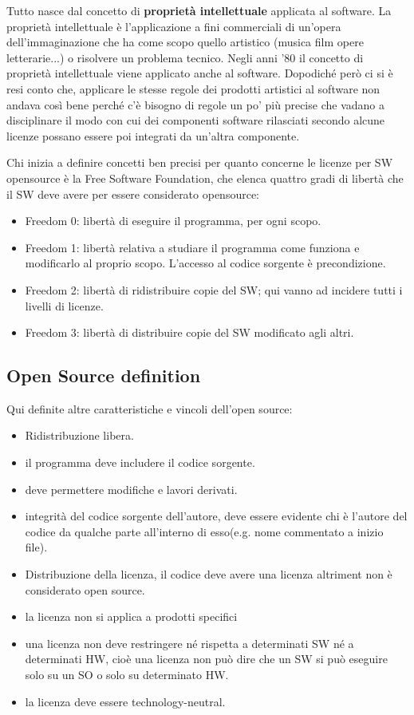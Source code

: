 \documentclass[10pt,a4paper]{book}
\begin{document}
Tutto nasce dal concetto di \textbf{proprietà intellettuale} applicata al software. La proprietà intellettuale è l'applicazione a fini commerciali di un'opera dell'immaginazione che ha come scopo quello artistico (musica film opere letterarie...) o risolvere un problema tecnico.
Negli anni '80 il concetto di proprietà intellettuale viene applicato anche al software.
Dopodiché però ci si è resi conto che, applicare le stesse regole dei prodotti artistici al software non andava così bene perché c'è bisogno di regole un po' più precise che vadano a disciplinare il modo con cui dei componenti software rilasciati secondo alcune licenze possano essere poi integrati da un'altra componente.

Chi inizia a definire concetti ben precisi per quanto concerne le licenze per SW opensource è la Free Software Foundation, che elenca quattro gradi di libertà che il SW deve avere per essere considerato opensource:
\begin{itemize}
\item Freedom 0: libertà di eseguire il programma, per ogni scopo.
\item Freedom 1: libertà relativa a studiare il programma come funziona e modificarlo al proprio scopo. L'accesso al codice sorgente è precondizione.
\item Freedom 2: libertà di ridistribuire copie del SW; qui vanno ad incidere tutti i livelli di licenze.
\item Freedom 3: libertà di distribuire copie del SW modificato agli altri.
\end{itemize}

\subsection{Open Source definition}
Qui definite altre caratteristiche e vincoli dell'open source:
\begin{itemize}
\item Ridistribuzione libera.
\item il programma deve includere il codice sorgente.
\item deve permettere modifiche e lavori derivati.
\item integrità del codice sorgente dell'autore, deve essere evidente chi è l'autore del codice da qualche parte all'interno di esso(e.g. nome commentato a inizio file).
\item Distribuzione della licenza, il codice deve avere una licenza altriment non è considerato open source.
\item la licenza non si applica a prodotti specifici
\item una licenza non deve restringere né rispetta a determinati SW né a determinati HW, cioè una licenza non può dire che un SW si può eseguire solo su un SO o solo su determinato HW.
\item la licenza deve essere technology-neutral.
\end{itemize}
\end{document}

